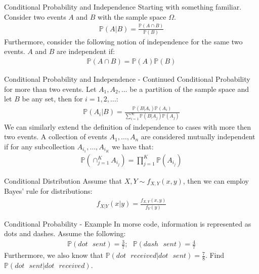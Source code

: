 \documentclass{beamer}
\begin{document}
\begin{frame}{Conditional Probability and Independence}
Starting with something familiar. Consider two events $A$ and $B$ with the sample space $\Omega$. 
\begin{align*}
\mathbb{P}(A|B) = \frac{\mathbb{P}(A \cap B)}{\mathbb{P}(B)}
\end{align*}
Furthermore, consider the following notion of independence for the same two events. $A$ and $B$ are independent if:
\begin{align*}
\mathbb{P}(A \cap B) = \mathbb{P}(A)\mathbb{P}(B)
\end{align*}
\end{frame}

\begin{frame}{Conditional Probability and Independence - Continued}
Conditional Probability for more than two events. Let $A_{1}, A_{2},\ldots$ be a partition of the sample space and let $B$ be any set, then for $i = 1, 2, \ldots$:
\begin{align*}
\mathbb{P}(A_{i}|B) = \frac{\mathbb{P}(B|A_{i})\mathbb{P}(A_{i})}{\sum_{i=1}^{\infty}\mathbb{P}(B|A_{j})\mathbb{P}(A_{j})}
\end{align*}
We can similarly extend the definition of independence to cases with more then two events. A collection of events $A_{1}, \ldots, A_{n}$ are considered mutually independent if for any subcollection $A_{i_{1}},\ldots,A_{i_{K}}$ we have that:
\begin{align*}
\mathbb{P}(\cap_{j = 1}^{K}A_{i_{j}}) = \prod_{j=1}^{K}\mathbb{P}(A_{i_{j}})
\end{align*}
\end{frame}

\begin{frame}{Conditional Distribution}
Assume that $X, Y \sim f_{X,Y}(x, y)$, then we can employ Bayes' rule for distributions:
\begin{align*}
f_{X|Y}(x|y) = \frac{f_{X, Y}(x, y)}{f_{Y}(y)}
\end{align*}
\end{frame}

\begin{frame}{Conditional Probability - Example}
In morse code, information is represented as dots and dashes. Assume the following:
\begin{align*}
\mathbb{P}(dot\>\>\> sent) = \frac{3}{7} ;\>\>\>
\mathbb{P}(dash \>\>\> sent) = \frac{4}{7}
\end{align*}
Furthermore, we also know that $\mathbb{P}(dot\>\>\> received | dot \>\>\> sent) = \frac{7}{8}$. Find $\mathbb{P}(dot\>\>\> sent| dot \>\>\> received)$. 
\end{frame}
\end{document}

